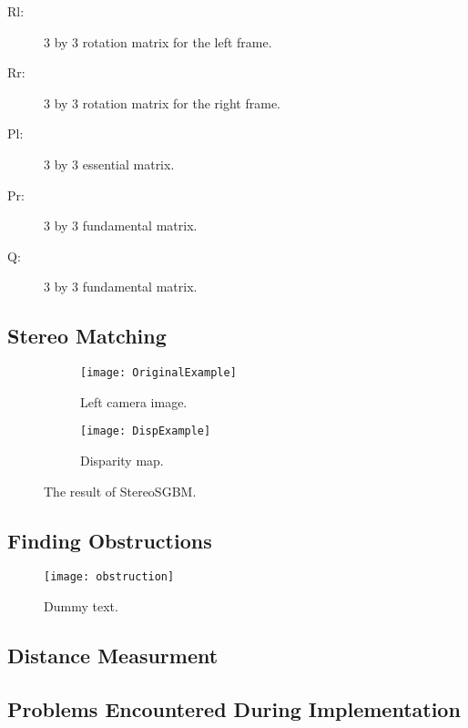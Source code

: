 \begin{description}
	\item[Rl: ] 3 by 3 rotation matrix for the left frame.
	\item[Rr: ] 3 by 3 rotation matrix for the right frame.
	\item[Pl: ] 3 by 3 essential matrix.
	\item[Pr: ] 3 by 3 fundamental matrix.
	\item[Q: ] 3 by 3 fundamental matrix.

\end{description}


\subsection{Stereo Matching}

\begin{figure}
\centering
 \begin{subfigure}[b]{0.45\textwidth}
        \texttt{[image: OriginalExample]}
        \caption{Left camera image.}
        \label{fig:OriginalExample}
    \end{subfigure}
    \begin{subfigure}[b]{0.45\textwidth}
        \texttt{[image: DispExample]}
        \caption{Disparity map.}
        \label{fig:DispExample}
    \end{subfigure}
    \caption{\label{fig:StereoMatching}The result of StereoSGBM.}
\end{figure}

\subsection{Finding Obstructions}

\begin{figure}
	\texttt{[image: obstruction]}
	\caption{Dummy text. }
	\label{fig:obstruction}
\end{figure}

\subsection{Distance Measurment}

\subsection{Problems Encountered During Implementation }